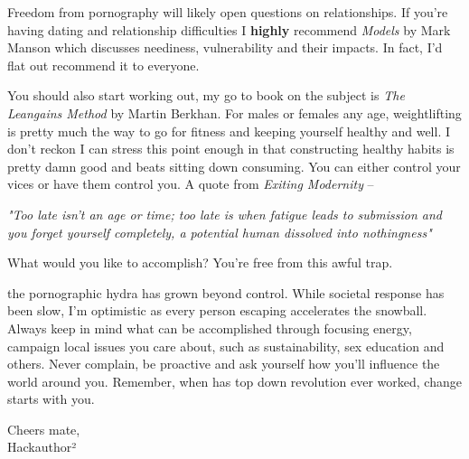 \documentclass[easypeasy.tex]{subfiles}
\begin{document}
Freedom from pornography will likely open questions on relationships. If you're having dating and relationship difficulties I \textbf{highly} recommend \textit{Models} by Mark Manson which discusses neediness, vulnerability and their impacts. In fact, I'd flat out recommend it to everyone.

You should also start working out, my go to book on the subject is \textit{The Leangains Method} by Martin Berkhan. For males or females any age, weightlifting is pretty much the way to go for fitness and keeping yourself healthy and well. I don't reckon I can stress this point enough in that constructing healthy habits is pretty damn good and beats sitting down consuming. You can either control your vices or have them control you. A quote from \textit{Exiting Modernity} --

\hspace{\parindent} \textit{"Too late isn’t an age or time; too late is when fatigue leads to submission and you forget yourself completely, a potential human dissolved into nothingness"}

What would you like to accomplish? You're free from this awful trap.

the pornographic hydra has grown beyond control. While societal response has been slow, I'm optimistic as every person escaping accelerates the snowball. Always keep in mind what can be accomplished through focusing energy, campaign local issues you care about, such as sustainability, sex education and others. Never complain, be proactive and ask yourself how you'll influence the world around you. Remember, when has top down revolution ever worked, change starts with you.

Cheers mate, \\
Hackauthor²
\end{document}
